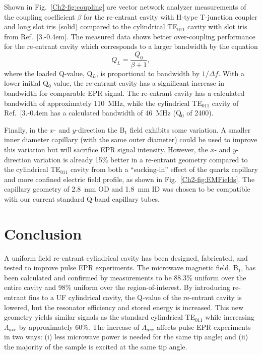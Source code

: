 Shown in Fig.~\ref{Ch2-fig:coupling} are vector network analyzer measurements of the coupling coefficient $\beta$ for the re-entrant \cylTE{} cavity with H-type T-junction coupler and long slot iris (solid) compared to the cylindrical TE$_{011}$ cavity with slot iris from Ref.~[3.\kern-0.4em]. The measured data shows better over-coupling performance for the re-entrant \cylTE{} cavity which corresponds to a larger bandwidth by the equation
\begin{equation}
    Q_L = \frac{Q_0}{\beta+1},
\end{equation}
where the loaded Q-value, Q$_L$, is proportional to bandwidth by $1/\Delta f$. \cite{ramo1984fields} With a lower initial Q$_0$ value, the re-entrant \cylTE{} cavity has a significant increase in bandwidth for comparable EPR signal. The re-entrant \cylTE{} cavity has a calculated bandwidth of approximately 110~MHz, while the cylindrical TE$_{011}$ cavity of Ref.~[3.\kern-0.4em has a calculated bandwidth of 46~MHz (Q$_0$ of 2400).

Finally, in the $x$- and $y$-direction the B$_1$ field exhibits some variation. A smaller inner diameter capillary (with the same outer diameter) could be used to improve this variation but will sacrifice EPR signal intensity. However, the $x$- and $y$-direction variation is already 15\% better in a re-entrant geometry compared to the cylindrical TE$_{011}$ cavity from both a ``sucking-in'' effect of the quartz capillary and more confined electric field profile, as shown in Fig.~\ref{Ch2-fig:EMFields}. The capillary geometry of 2.8~mm OD and 1.8~mm ID was chosen to be compatible with our current standard Q-band capillary tubes. 

\section{Conclusion}

A uniform field re-entrant cylindrical \cylTE{} cavity has been designed, fabricated, and tested to improve pulse EPR experiments. The microwave magnetic field, B$_1$, has been calculated and confirmed by measurements to be 88.3\% uniform over the entire cavity and 98\% uniform over the region-of-interest. By introducing re-entrant fins to a UF cylindrical \cylTE{} cavity, the Q-value of the re-entrant \cylTE{} cavity is lowered, but the resonator efficiency and stored energy is increased. This new geometry yields similar signals as the standard cylindrical TE$_{011}$ while increasing $\Lambda_{ave}$ by approximately 60\%. The increase of $\Lambda_{ave}$ affects pulse EPR experiments in two ways: (i) less microwave power is needed for the same tip angle; and (ii) the majority of the sample is excited at the same tip angle. 

